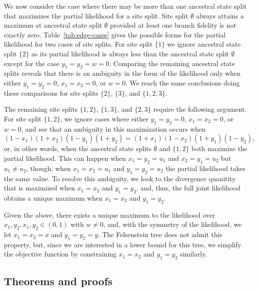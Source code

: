 We now consider the case where there may be more than one ancestral state split that maximizes the partial likelihood for a site split.
Site split $\emptyset$ always attains a maximum at ancestral state split $\emptyset$ provided at least one branch fidelity is not exactly zero.
Table~\ref{tab:edge-cases} gives the possible forms for the partial likelihood for two cases of site splits.
For site split $\{1\}$ we ignore ancestral state split $\{2\}$ as its partial likelihood is always less than the ancestral state split $\emptyset$ except for the case $y_1=y_2=w=0$.
Comparing the remaining ancestral state splits reveals that there is an ambiguity in the form of the likelihood only when either $y_1=y_2=0$, $x_1=x_2=0$, or $w=0$.
We reach the same conclusions doing these comparisons for site splits $\{2\}$, $\{3\}$, and $\{1,2,3\}$.

The remaining site splits $\{1,2\}$, $\{1,3\}$, and $\{2,3\}$ require the following argument.
For site split $\{1,2\}$, we ignore cases where either $y_1=y_2=0$, $x_1=x_2=0$, or $w=0$, and see that an ambiguity in this maximization occurs when
\[
(1-x_1)(1+x_2)(1-y_1)(1+y_2) = (1+x_1)(1-x_2)(1+y_1)(1-y_2),
\]
or, in other words, when the ancestral state splits $\emptyset$ and $\{1,2\}$ both maximize the partial likelihood.
This can happen when $x_1=y_2=u_1$ and $x_2=y_1=u_2$ but $u_1 \neq u_2$, though, when $x_1=x_2=u_1$ and $y_1=y_2=u_2$ the partial likelihood takes the same value.
To resolve this ambiguity, we look to the divergence quanitity that is maximized when $x_1=x_2$ and $y_1=y_2$, and, thus, the full joint likelihood obtains a unique maximum when $x_1=x_2$ and $y_1=y_2$.

Given the above, there exists a unique maximum to the likelihood over $x_1,y_2,x_1,y_2\in(0,1)$ with $w\neq 0$, and, with the symmetry of the likelihood, we let $x_1=x_2=x$ and $y_1=y_2=y$.
The Felsenstein tree does not admit this property, but, since we are interested in a lower bound for this tree, we simplify the objective function by constraining $x_1=x_2$ and $y_1=y_2$ similarly.

\subsection*{Theorems and proofs}

\topoInconsist*

